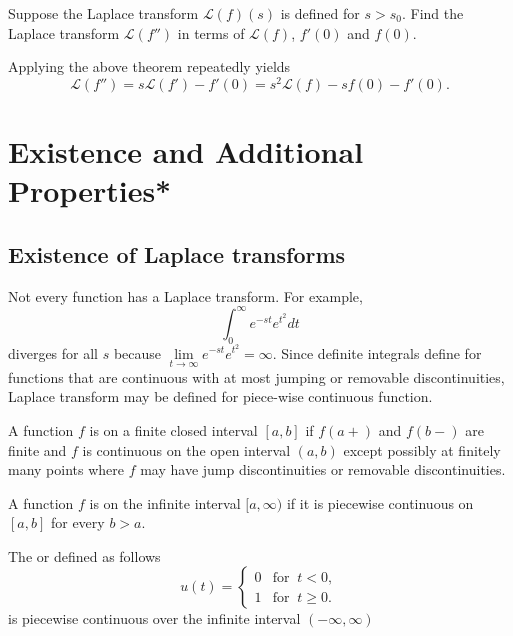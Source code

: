 \begin{example}
  Suppose the Laplace transform 
    $\mathcal{L}(f)(s)$
    is defined for $s>s_0$. 
  Find the Laplace transform $\mathcal{L}(f'')$ in terms of $\mathcal{L}(f)$, $f'(0)$ and $f(0)$.
\end{example}
\begin{solution}
Applying the above theorem repeatedly yields
\[
  \mathcal{L}(f'')
  =s\mathcal{L}(f')-f'(0)=s^2\mathcal{L}(f)-sf(0)-f'(0).
\]
\end{solution}


\section{Existence and Additional Properties*}

\subsection*{Existence of Laplace transforms}

Not every function has a Laplace transform. For example, 
\[\int_0^\infty e^{-st}e^{t^2} dt\]
diverges for all $s$ because $\lim\limits_{t\to\infty}e^{-st}e^{t^2}=\infty$.
Since definite integrals define for functions that are continuous with at most jumping or removable discontinuities, Laplace transform may be defined for piece-wise continuous function. 

\begin{definition}
A function $f$ is  on a finite closed interval $[a,b]$ if $f(a+)$ and $f(b-)$ are finite and $f$ is continuous on the open interval $(a,b)$ except possibly at finitely many points where $f$ may have jump discontinuities or removable discontinuities.

A function $f$ is  on the infinite interval $[a,\infty)$ if it is piecewise continuous on $[a,b]$ for every $b>a$.
\end{definition}

\begin{example}
  The  or  defined as follows
  \[
    u(t)=\begin{cases}
    0 & \text{for }~ t<0,\\
    1 & \text{for }~ t\ge 0.
  \end{cases}
  \]
  is piecewise continuous over the infinite interval $(-\infty, \infty)$
\end{example}

